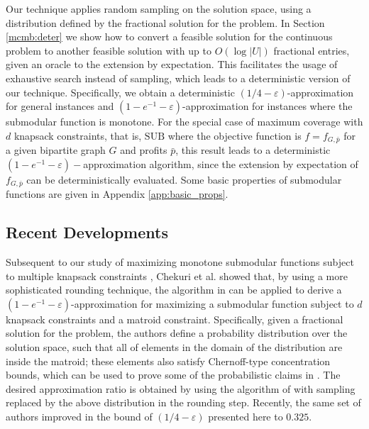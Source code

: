 \documentclass[11pt]{article}
\newcommand{\eps}{\varepsilon}
\newcommand{\comment}[1]{}
\newcommand{\SUB}{\mbox{SUB}}
\begin{document}
{Our technique applies random sampling on the solution space, using
a distribution defined by the fractional solution for the problem.
In Section \ref{mcmb:deter} we show how to convert a feasible
solution for the continuous problem to another feasible solution
with up to $O(\log |U|)$ fractional entries, given an oracle to
the extension by expectation. This facilitates the usage of
exhaustive search instead of sampling, which leads to a
deterministic version of our technique. Specifically, we obtain a
deterministic $(1/4 -\eps)$-approximation for general instances
and $(1- e^{-1} -\eps)$-approximation for instances where the
submodular function is monotone.
For the special case of maximum
coverage with $d$ knapsack constraints,
that is, $\SUB$ where the objective
function is $f=f_{G,\bar{p}}$  for a given bipartite graph $G$ and
profits $\bar{p}$, this result leads to a deterministic $(1-
e^{-1} -\eps)-$approximation algorithm, since the extension by
expectation of $f_{G,\bar{p}}$ can be deterministically evaluated.
Some basic properties of submodular functions are given in
Appendix \ref{app:basic_props}.

\subsection{Recent Developments}

Subsequent to our study of maximizing monotone submodular
functions subject to multiple knapsack constraints \cite{KST09},
Chekuri et al. \cite{CVZ10}
showed that, by using a more
sophisticated rounding technique,
the algorithm in
\cite{KST09} can be applied to derive a
$(1-e^{-1}-\eps)$-approximation for
maximizing a submodular function subject to $d$ knapsack
constraints and a matroid constraint.
Specifically, given a fractional solution for the problem, the
authors
define a probability distribution over the solution space, such
that all of elements in the domain of the distribution are inside
the matroid; these elements also satisfy Chernoff-type
concentration bounds, which can be used to prove some of the
probabilistic claims in \cite{KST09}.
The desired approximation ratio is obtained by using the algorithm
of \cite{KST09} with sampling replaced by the above distribution
in the rounding step.
Recently, the same set of authors improved in \cite{CVZ10a} the
bound of $(1/4- \eps)$ presented here to $0.325$.


\comment{
 In~\cite{CVZ10} Chekuri, Vondr\'{a}k and Zenklusen
presented a $(1-e^{-1}-\eps)$-approximation algorithm for monotone
maximization subject to $d$ knapsack constraints and a matroid
constraint. Their main tool was to provide a distribution (given a
fractional solution), such that every element in the
distribution's domain is inside the matroid, and also maintains a
Chernoff-type concentration bounds which can be used to prove our
probabilistic claims. By applying this distribution over our
algorithm (while referring to \cite{KST09}), instead of a
sampling, the desired approximation ratio was attained. }


}
\end{document}
